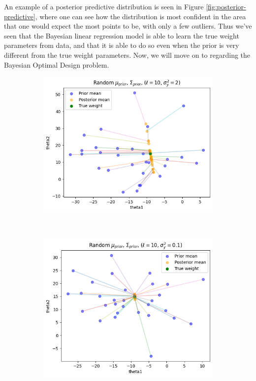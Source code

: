 An example of a posterior predictive distribution is seen in Figure \ref{fig:posterior-predictive}, where one can see how the distribution is most confident in the area that one would expect the most points to be, with only a few outliers.
Thus we've seen that the Bayesian linear regression model is able to learn the true weight parameters from data, and that it is able to do so even when the prior is very different from the true weight parameters. Now, we will move on to regarding the Bayesian Optimal Design problem.
\begin{figure}[H]
\centering
\begin{subfigure}{.5\textwidth}
  \includegraphics[width=1\textwidth]{assets/week1/random-priors-new-few.png}
\end{subfigure}\\
\begin{subfigure}{.5\textwidth}
  \includegraphics[width=1\textwidth]{assets/week1/random-priors-new-few-accurate.png}

\end{subfigure}
\end{figure}
